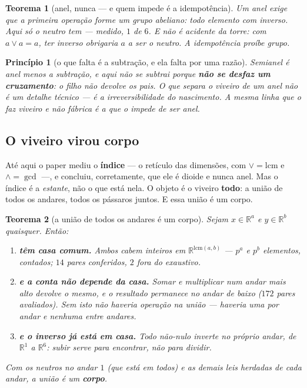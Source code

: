 \documentclass[11pt]{article}
\newcommand{\R}{\mathbb R}
\theoremstyle{plain}
\newtheorem{teorema}{Teorema}
\newtheorem{principio}{Princípio}
\theoremstyle{remark}
\begin{document}
\begin{teorema}[anel, nunca --- e quem impede é a idempotência]
Um anel exige que a primeira operação forme um \emph{grupo} abeliano: todo elemento com inverso. Aqui
só o neutro tem --- medido, $1$ de $6$. E não é acidente da torre: com $a\vee a=a$, ter inverso
obrigaria $a$ a ser o neutro. \emph{A idempotência proíbe grupo.}
\end{teorema}

\begin{principio}[o que falta é a subtração, e ela falta por uma razão]
Semianel é anel menos a subtração, e aqui não se subtrai porque \textbf{não se desfaz um
cruzamento}: o filho não devolve os pais. O que separa o viveiro de um anel não é um detalhe técnico
--- é a irreversibilidade do nascimento. A mesma linha que o faz viveiro e não fábrica é a que o
impede de ser anel.
\end{principio}

\subsection{O viveiro virou corpo}

Até aqui o paper mediu o \textbf{índice} --- o retículo das dimensões, com $\vee=\mathrm{lcm}$ e
$\wedge=\gcd$ ---, e concluiu, corretamente, que ele é dioide e nunca anel. Mas o índice é a
\emph{estante}, não o que está nela. O objeto é o viveiro \textbf{todo}: a união de todos os
andares, todos os pássaros juntos. E essa união é um corpo.

\begin{teorema}[a união de todos os andares é um corpo]
Sejam $x\in\R^a$ e $y\in\R^b$ quaisquer. Então:
\begin{enumerate}\itemsep2pt
\item \textbf{têm casa comum.} Ambos cabem inteiros em $\R^{\mathrm{lcm}(a,b)}$ --- $p^a$ e $p^b$
elementos, contados; $14$ pares conferidos, $2$ fora do exaustivo.
\item \textbf{e a conta não depende da casa.} Somar e multiplicar num andar mais alto devolve o
mesmo, e o resultado permanece no andar de baixo ($172$ pares avaliados). Sem isto não haveria
operação \emph{na união} --- haveria uma por andar e nenhuma entre andares.
\item \textbf{e o inverso já está em casa.} Todo não-nulo inverte no próprio andar, de $\R^1$ a
$\R^6$: subir serve para \emph{encontrar}, não para dividir.
\end{enumerate}
Com os neutros no andar $1$ (que está em todos) e as demais leis herdadas de cada andar, a união é
um \textbf{corpo}.
\end{teorema}
\end{document}
